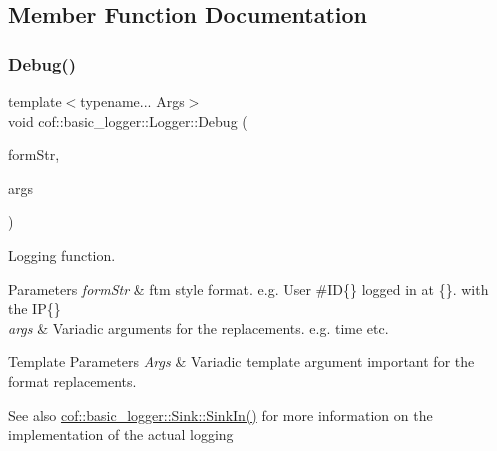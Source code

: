 \subsection{Member Function Documentation}
\mbox{\label{classcof_1_1basic__logger_1_1_logger_a4562cce09bb747a47ce052f5388b16b6}} 
\subsubsection{\texorpdfstring{Debug()}{Debug()}}
{\footnotesize\ttfamily template$<$typename... Args$>$ \\
void cof\+::basic\+\_\+logger\+::\+Logger\+::\+Debug (\begin{DoxyParamCaption}\item[{const char $\ast$}]{form\+Str,  }\item[{const Args \&...}]{args }\end{DoxyParamCaption})\hspace{0.3cm}{\ttfamily [inline]}}



Logging function. 


\begin{DoxyParams}{Parameters}
{\em form\+Str} & ftm style format. e.\+g. {\ttfamily User \#\+ID\{\} logged in at \{\}. with the IP\{\}} \\
\hline
{\em args} & Variadic arguments for the replacements. e.\+g. time etc. \\
\hline
\end{DoxyParams}

\begin{DoxyTemplParams}{Template Parameters}
{\em Args} & Variadic template argument important for the format replacements. \\
\hline
\end{DoxyTemplParams}
\begin{DoxySeeAlso}{See also}
\hyperlink{classcof_1_1basic__logger_1_1_sink_a085f8c690add00cf55ef0754c5900397}{cof\+::basic\+\_\+logger\+::\+Sink\+::\+Sink\+In()} for more information on the implementation of the actual logging 
\end{DoxySeeAlso}
\mbox{\label{classcof_1_1basic__logger_1_1_logger_a6de6aa4607ebb5edf8d3732f214f41f1}} 

